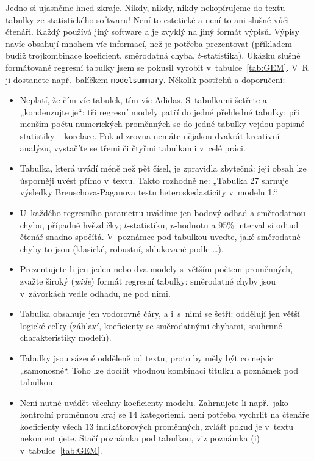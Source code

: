 \documentclass[11pt,a4paper]{article}
\begin{document}
Jedno si ujasněme hned zkraje. Nikdy, nikdy, nikdy nekopírujeme do textu tabulky ze statistického softwaru! Není to estetické a není to ani slušné vůči čtenáři. Každý používá jiný software a je zvyklý na jiný formát výpisů. Výpisy navíc obsahují mnohem víc informací, než je potřeba prezentovat (příkladem budiž trojkombinace koeficient, směrodatná chyba, $t$-statistika). Ukázku slušně formátované regresní tabulky jsem se pokusil vyrobit v~tabulce~\ref{tab:GEM}. V~R ji dostanete např.\ balíčkem \texttt{modelsummary}. Několik postřehů a doporučení:
\begin{itemize}[itemsep=2pt, topsep=2pt]
  \item Neplatí, že čím víc tabulek, tím víc Adidas. S~tabulkami šetřete a „kondenzujte je“: tři regresní modely patří do jedné přehledné tabulky; při menším počtu numerických proměnných se do jedné tabulky vejdou popisné statistiky i~korelace. Pokud zrovna nemáte nějakou dvakrát kreativní analýzu, vystačíte se třemi či čtyřmi tabulkami v~celé práci.
  \item Tabulka, která uvádí méně než pět čísel, je zpravidla zbytečná: její obsah lze úsporněji uvést přímo v~textu. Takto rozhodně ne: „Tabulka 27 shrnuje výsledky Breuschova-Paganova testu heteroskedasticity v~modelu 1.“
  \item U~každého regresního parametru uvádíme jen bodový odhad a směrodatnou chybu, případně hvězdičky; $t$-statistiku, $p$-hodnotu a 95\% interval si odtud čtenář snadno spočítá. V~poznámce pod tabulkou uveďte, jaké směrodatné chyby to jsou (klasické, robustní, shlukované podle \ldots).
  \item Prezentujete-li jen jeden nebo dva modely s~větším počtem proměnných, zvažte široký (\textit{wide}) formát regresní tabulky: směrodatné chyby jsou v~závorkách vedle odhadů, ne pod nimi.
  \item Tabulka obsahuje jen vodorovné čáry, a i~s~nimi se šetří: oddělují jen větší logické celky (záhlaví, koeficienty se směrodatnými chybami, souhrnné charakteristiky modelů).
  \item Tabulky jsou sázené odděleně od textu, proto by měly být co nejvíc „samonosné“. Toho lze docílit vhodnou kombinací titulku a poznámek pod tabulkou.
  \item Není nutné uvádět všechny koeficienty modelu. Zahrnujete-li např.\ jako kontrolní proměnnou kraj se 14 kategoriemi, není potřeba vychrlit na čtenáře koeficienty všech 13 indikátorových proměnných, zvlášť pokud je v~textu nekomentujete. Stačí poznámka pod tabulkou, viz poznámka (i) v~tabulce~\ref{tab:GEM}.

\end{itemize}
\end{document}
